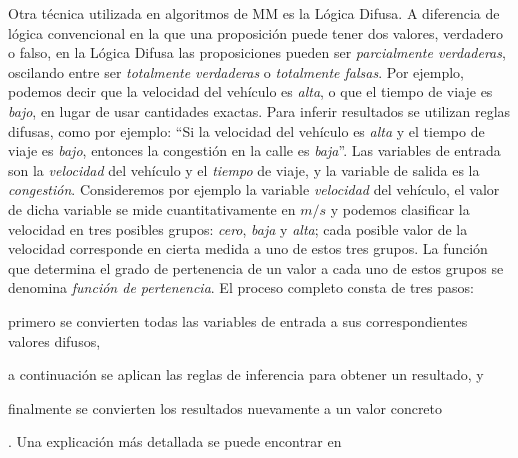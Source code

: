 Otra técnica utilizada en algoritmos de MM es la Lógica Difusa. A diferencia de lógica convencional en la que una proposición puede tener dos valores, verdadero o falso, en la Lógica Difusa las proposiciones pueden ser \emph{parcialmente verdaderas}, oscilando entre ser \emph{totalmente verdaderas} o \emph{totalmente falsas}. Por ejemplo, podemos decir que la velocidad del vehículo es \emph{alta}, o que el tiempo de viaje es \emph{bajo}, en lugar de usar cantidades exactas. Para inferir resultados se utilizan reglas difusas, como por ejemplo: “Si la velocidad del vehículo es \emph{alta} y el tiempo de viaje es \emph{bajo}, entonces la congestión en la calle es \emph{baja}”. Las variables de entrada son la \emph{velocidad} del vehículo y el \emph{tiempo} de viaje, y la variable de salida es la \emph{congestión}. Consideremos por ejemplo la variable \emph{velocidad} del vehículo, el valor de dicha variable se mide cuantitativamente en $m/s$ y podemos clasificar la velocidad en tres posibles grupos: \emph{cero}, \emph{baja} y \emph{alta}; cada posible valor de la velocidad corresponde en cierta medida a uno de estos tres grupos. La función que determina el grado de pertenencia de un valor a cada uno de estos grupos se denomina \emph{función de pertenencia}. El proceso completo consta de tres pasos: \begin{enumerate*}[1)]
\item primero se convierten todas las variables de entrada a sus correspondientes valores difusos, 
\item a continuación se aplican las reglas de inferencia para obtener un resultado, y
\item finalmente se convierten los resultados nuevamente a un valor concreto
\end{enumerate*}. Una explicación más detallada se puede encontrar en \citep{zadeh1988fuzzy}

